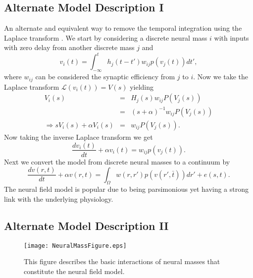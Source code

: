 \documentclass[onecolumn,draftcls]{IEEEtran}
\begin{document}
\subsection{Alternate Model Description I}
An alternate and equivalent way to remove the temporal integration using the Laplace transform . We start by considering a discrete neural mass $i$ with inputs with zero delay from another discrete mass $j$ and
\begin{equation}\label{TwoDiscreteMasses}
{v_i}\left( t \right) = \int_{ - \infty }^t {{h_j}(t - t'){w_{ij}}p\left( {{v_j}\left( t \right)} \right)dt'},
\end{equation}
where $w_{ij}$ can be considered the synaptic efficiency from $j$ to $i$. Now we take the Laplace transform $\mathcal{L}(v_i(t))=V(s)$ yielding
\begin{eqnarray}
  {V_i}\left( s \right) &=& {H_j}\left( s \right){w_{ij}}P\left( {{V_j}\left( s \right)} \right) \nonumber \\
   &=& {\left( {s + \alpha} \right)^{ - 1}}{w_{ij}}P\left( {{V_j}\left( s \right)} \right)  \\
  \Rightarrow s{V_i}\left( s \right) + \alpha{V_i}\left( s \right) &=& {w_{ij}}P\left( {{V_j}\left( s \right)} \right).
\end{eqnarray}
Now taking the inverse Laplace transform we get
\begin{equation}\label{InverseLaplace}
\frac{{d{v_i}\left( t \right)}}{{dt}} + \alpha{v_i}\left( t \right) = {w_{ij}}p\left( {{v_j}\left( t \right)} \right).
\end{equation}
Next we convert the model from discrete neural masses to a continuum by
\begin{equation}\label{Discrete2Continuum}
\frac{{dv\left( {r,t} \right)}}{{dt}} + \alpha{v\left( {r,t} \right)} = \int_\Omega  {w\left( {r,r'} \right)p\left( {v\left( {r',\bar t} \right)} \right)dr'}  + e\left( {s,t} \right).
\end{equation}
The neural field model is popular due to being parsimonious yet having a strong link with the underlying physiology.

\subsection{Alternate Model Description II}

\begin{figure*}
\centering
\texttt{[image: NeuralMassFigure.eps]}
\caption[NeuralMassModel]{This figure describes the basic interactions of neural masses that constitute the neural field model.}
\label{NeuralMassModel}
\end{figure*}
\end{document}
